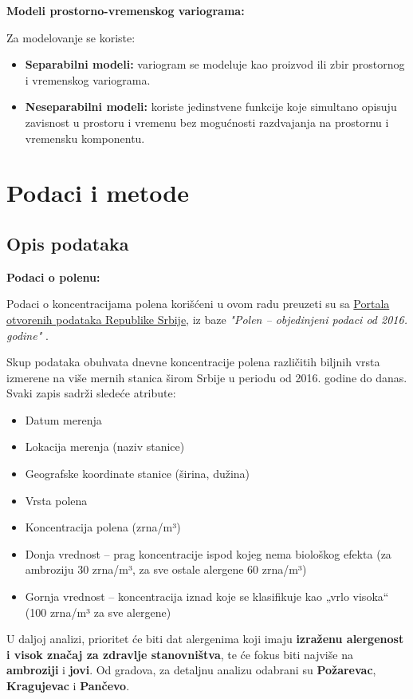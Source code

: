 \documentclass[12pt]{article}
\begin{document}
\textbf{Modeli prostorno-vremenskog variograma:}

Za modelovanje se koriste:

\begin{itemize}
    \item \textbf{Separabilni modeli:} variogram se modeluje kao proizvod ili zbir prostornog i vremenskog variograma.

    \item \textbf{Neseparabilni modeli:} koriste jedinstvene funkcije koje simultano opisuju zavisnost u prostoru i vremenu bez mogućnosti razdvajanja na prostornu i vremensku komponentu.
\end{itemize}



\newpage
\section{Podaci i metode}
\subsection{Opis podataka}
\textbf{Podaci o polenu:}

Podaci o koncentracijama polena korišćeni u ovom radu preuzeti su sa \href{https://data.gov.rs/sr/datasets/polen-objedinjeni-podatsi-od-2016-godine/}{Portala otvorenih podataka Republike Srbije}, iz baze \textit{"Polen – objedinjeni podaci od 2016. godine"} \cite{rhmz2023}.

Skup podataka obuhvata dnevne koncentracije polena različitih biljnih vrsta izmerene na više mernih stanica širom Srbije u periodu od 2016. godine do danas. Svaki zapis sadrži sledeće atribute:
\begin{itemize}[noitemsep]
\item Datum merenja
\item Lokacija merenja (naziv stanice)
\item Geografske koordinate stanice (širina, dužina)
\item Vrsta polena
\item Koncentracija polena (zrna/m³)
\item Donja vrednost – prag koncentracije ispod kojeg nema biološkog efekta (za ambroziju 30 zrna/m³, za sve ostale alergene 60 zrna/m³) \cite{damato2007}
\item Gornja vrednost – koncentracija iznad koje se klasifikuje kao „vrlo visoka“ (100 zrna/m³ za sve alergene) \cite{who2003}
\end{itemize}
U daljoj analizi, prioritet će biti dat alergenima koji imaju \textbf{izraženu alergenost i visok značaj za zdravlje stanovništva}, te će fokus biti najviše na \textbf{ambroziji} i \textbf{jovi}. Od gradova, za detaljnu analizu odabrani su \textbf{Požarevac}, \textbf{Kragujevac} i \textbf{Pančevo}.
\end{document}
